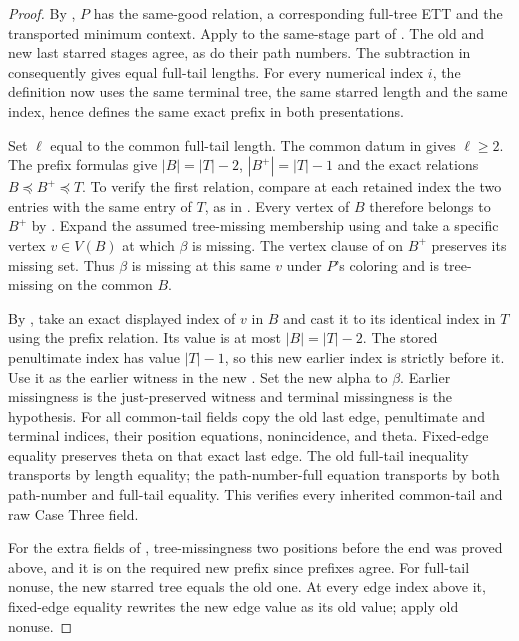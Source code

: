 \begin{proof}
By , $P$ has the same-good
relation, a corresponding full-tree ETT and the transported minimum
context. Apply  to the same-stage
part of . The old and new last starred stages
agree, as do their path numbers. The subtraction in
 consequently gives equal full-tail
lengths. For every numerical index $i$, the definition
 now uses the same terminal tree, the
same starred length and the same index, hence defines the same exact
prefix in both presentations.

Set $\ell$ equal to the common full-tail length. The common datum in
 gives $\ell\ge2$.
The prefix formulas give $|B|=|T|-2$, $|B^+|=|T|-1$ and the exact
relations $B\preccurlyeq B^+\preccurlyeq T$. To verify the first
relation, compare at each retained index the two entries with the same
entry of $T$, as in .
Every vertex of $B$ therefore belongs to $B^+$ by
. Expand the assumed
tree-missing membership using  and take a
specific vertex $v\in V(B)$ at which $\beta$ is missing. The vertex
clause of  on $B^+$ preserves its missing
set. Thus $\beta$ is missing at this same $v$ under $P$'s coloring and is
tree-missing on the common $B$.

By , take an exact displayed index of
$v$ in $B$ and cast it to its identical index in $T$ using the prefix
relation. Its value is at most $|B|=|T|-2$. The stored penultimate index
has value $|T|-1$, so this new earlier index is strictly before it.
Use it as the earlier witness in the new
. Set the new alpha to
$\beta$. Earlier missingness is the just-preserved witness and terminal
missingness is the hypothesis. For all common-tail fields copy the old
last edge, penultimate and terminal indices, their position equations,
nonincidence, and theta. Fixed-edge equality preserves theta on that
exact last edge. The old full-tail inequality transports by length
equality; the path-number-full equation transports by both path-number
and full-tail equality. This verifies every inherited common-tail and
raw Case Three field.

For the extra fields of
, tree-missingness
two positions before the end was proved above, and it is on the required
new prefix since prefixes agree. For full-tail nonuse, the new starred
tree equals the old one. At every edge index above it, fixed-edge
equality rewrites the new edge value as its old value; apply old nonuse.


\end{proof}
